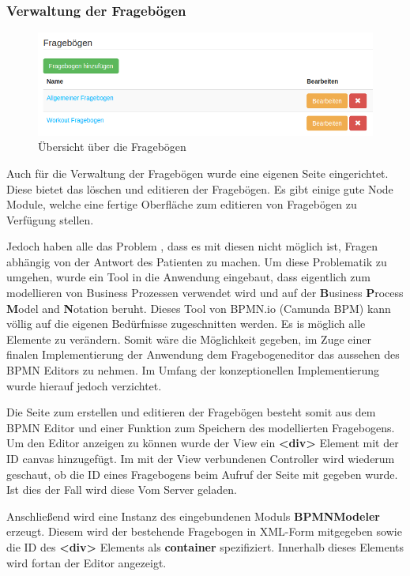 \subsubsection{Verwaltung der Fragebögen}\label{_ImpTCFragebogen}
\begin{figure}
	\centering
	\includegraphics[scale=0.4]{images/Screenshots/FragebogenUebersicht}
	\caption[Übersicht über die Fragebögen]{Übersicht über die Fragebögen}
	\label{FragebogenUebersicht}
\end{figure}
Auch für die Verwaltung der Fragebögen wurde eine eigenen Seite eingerichtet. Diese bietet das löschen und editieren der Fragebögen. Es gibt einige gute Node Module, welche eine fertige Oberfläche zum editieren von Fragebögen zu Verfügung stellen.

Jedoch haben alle das Problem , dass es mit diesen nicht möglich ist, Fragen abhängig von der Antwort des Patienten zu machen. Um diese Problematik zu umgehen, wurde ein Tool in die Anwendung eingebaut, dass eigentlich zum modellieren von Business Prozessen verwendet wird und auf der \textbf{B}usiness \textbf{P}rocess \textbf{M}odel and \textbf{N}otation beruht. Dieses Tool von BPMN.io (Camunda BPM) kann völlig auf die eigenen Bedürfnisse zugeschnitten werden. Es is möglich alle Elemente zu verändern. Somit wäre die Möglichkeit gegeben, im Zuge einer finalen Implementierung der Anwendung dem Fragebogeneditor das aussehen des BPMN Editors zu nehmen. Im Umfang der konzeptionellen Implementierung wurde hierauf jedoch verzichtet.

Die Seite zum erstellen und editieren der Fragebögen besteht somit aus dem BPMN Editor und einer Funktion zum Speichern des modellierten Fragebogens. Um den Editor anzeigen zu können wurde der View ein \textbf{<div>} Element mit der ID canvas hinzugefügt. Im mit der View verbundenen Controller wird wiederum geschaut, ob die ID eines Fragebogens beim Aufruf der Seite mit gegeben wurde. Ist dies der Fall wird diese Vom Server geladen.

Anschließend wird eine Instanz des eingebundenen Moduls \textbf{BPMNModeler} erzeugt. Diesem wird der bestehende Fragebogen in XML-Form mitgegeben sowie die ID des \textbf{<div>} Elements als \textbf{container} spezifiziert. Innerhalb dieses Elements wird fortan der Editor angezeigt.

